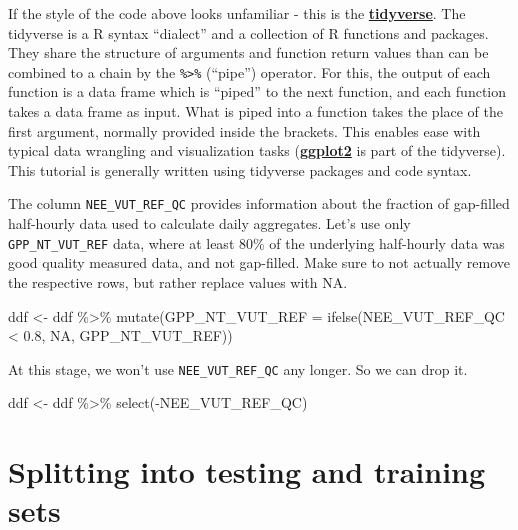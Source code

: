 \documentclass[
]{book}
\newenvironment{Shaded}{\begin{snugshade}}{\end{snugshade}}
\newcommand{\AttributeTok}[1]{\textcolor[rgb]{0.77,0.63,0.00}{#1}}
\newcommand{\ConstantTok}[1]{\textcolor[rgb]{0.00,0.00,0.00}{#1}}
\newcommand{\FloatTok}[1]{\textcolor[rgb]{0.00,0.00,0.81}{#1}}
\newcommand{\FunctionTok}[1]{\textcolor[rgb]{0.00,0.00,0.00}{#1}}
\newcommand{\NormalTok}[1]{#1}
\newcommand{\OtherTok}[1]{\textcolor[rgb]{0.56,0.35,0.01}{#1}}
\newcommand{\SpecialCharTok}[1]{\textcolor[rgb]{0.00,0.00,0.00}{#1}}
\begin{document}
If the style of the code above looks unfamiliar - this is the \textbf{\href{https://www.tidyverse.org/}{tidyverse}}. The tidyverse is a R syntax ``dialect'' and a collection of R functions and packages. They share the structure of arguments and function return values than can be combined to a chain by the \texttt{\%\textgreater{}\%} (``pipe'') operator. For this, the output of each function is a data frame which is ``piped'' to the next function, and each function takes a data frame as input. What is piped into a function takes the place of the first argument, normally provided inside the brackets. This enables ease with typical data wrangling and visualization tasks (\textbf{\href{https://ggplot2.tidyverse.org/}{ggplot2}} is part of the tidyverse). This tutorial is generally written using tidyverse packages and code syntax.

The column \texttt{NEE\_VUT\_REF\_QC} provides information about the fraction of gap-filled half-hourly data used to calculate daily aggregates. Let's use only \texttt{GPP\_NT\_VUT\_REF} data, where at least 80\% of the underlying half-hourly data was good quality measured data, and not gap-filled. Make sure to not actually remove the respective rows, but rather replace values with NA.

\begin{Shaded}
\begin{Highlighting}[]
\NormalTok{ddf }\OtherTok{\textless{}{-}}\NormalTok{ ddf }\SpecialCharTok{\%\textgreater{}\%} 
  \FunctionTok{mutate}\NormalTok{(}\AttributeTok{GPP\_NT\_VUT\_REF =} \FunctionTok{ifelse}\NormalTok{(NEE\_VUT\_REF\_QC }\SpecialCharTok{\textless{}} \FloatTok{0.8}\NormalTok{, }\ConstantTok{NA}\NormalTok{, GPP\_NT\_VUT\_REF))}
\end{Highlighting}
\end{Shaded}

At this stage, we won't use \texttt{NEE\_VUT\_REF\_QC} any longer. So we can drop it.

\begin{Shaded}
\begin{Highlighting}[]
\NormalTok{ddf }\OtherTok{\textless{}{-}}\NormalTok{ ddf }\SpecialCharTok{\%\textgreater{}\%} 
  \FunctionTok{select}\NormalTok{(}\SpecialCharTok{{-}}\NormalTok{NEE\_VUT\_REF\_QC)}
\end{Highlighting}
\end{Shaded}

\hypertarget{splitting-into-testing-and-training-sets}{%
\section{Splitting into testing and training sets}\label{splitting-into-testing-and-training-sets}}
\end{document}

